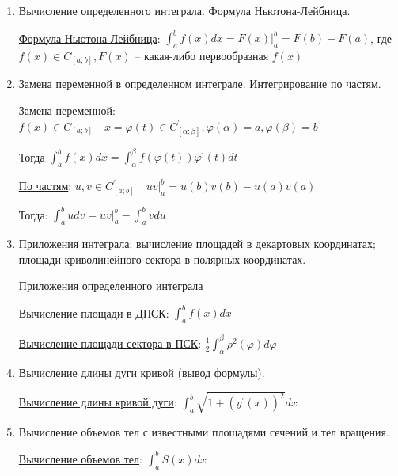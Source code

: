 \documentclass[12pt]{article}
\begin{document}
\begin{enumerate}
        \hyperlink{theorembarrow}{Теорема Барроу}: $f(x) : [a;+\infty) \to \Real \quad f(x) \in C_{[a;+\infty)}$

        Тогда $\Phi(x) = \int^x_a f(t) dt$ -- первообразная для $f(x)$ - $\Phi(x) = F(x)$


        \item Вычисление определенного интеграла. Формула Ньютона-Лейбница.

        \hyperlink{formulanewtonleibniz}{Формула Ньютона-Лейбница}: $\int^b_a f(x)dx = F(x) \Big|^b_a = F(b) - F(a)$, где $f(x) \in C_{[a;b]}, F(x)$ -- какая-либо первообразная $f(x)$

        \item Замена переменной в определенном интеграле. Интегрирование по частям.

        \hyperlink{integralsubstitution}{Замена переменной}: $f(x) \in C_{[a;b]} \quad x = \varphi(t) \in C^\prime_{[\alpha;\beta]}, \varphi(\alpha) = a, \varphi(\beta) = b$

        Тогда $\int^b_a f(x)dx = \int^\beta_\alpha f(\varphi(t)) \varphi^\prime(t) dt$

        \hyperlink{integralbyparts}{По частям}: $u, v \in C^\prime_{[a;b]} \quad uv \Big|_a^b = u(b)v(b) - u(a)v(a)$

        Тогда: $\int^b_a udv = uv \Big|_a^b - \int^b_a vdu$


        \item Приложения интеграла: вычисление площадей в декартовых координатах; площади криволинейного сектора в полярных координатах.

        \hyperlink{integralapplications}{Приложения определенного интеграла}

        \hyperlink{integralareadpsk}{Вычисление площади в ДПСК}: $\int_a^b f(x) dx$

        \hyperlink{integralareapsk}{Вычисление площади сектора в ПСК}: $\frac{1}{2} \int_\alpha^\beta \rho^2(\varphi) d\varphi$


        \item Вычисление длины дуги кривой (вывод формулы).

        \hyperlink{lengthofarc}{Вычисление длины кривой дуги}: $\int_a^b \sqrt{1 + (y^\prime(x))^2} dx$

        \item Вычисление объемов тел с известными площадями сечений и тел вращения.

        \hyperlink{volumeofbodieswithknownarea}{Вычисление объемов тел}: $\int^b_a S(x)dx$


\end{enumerate}
\end{document}
